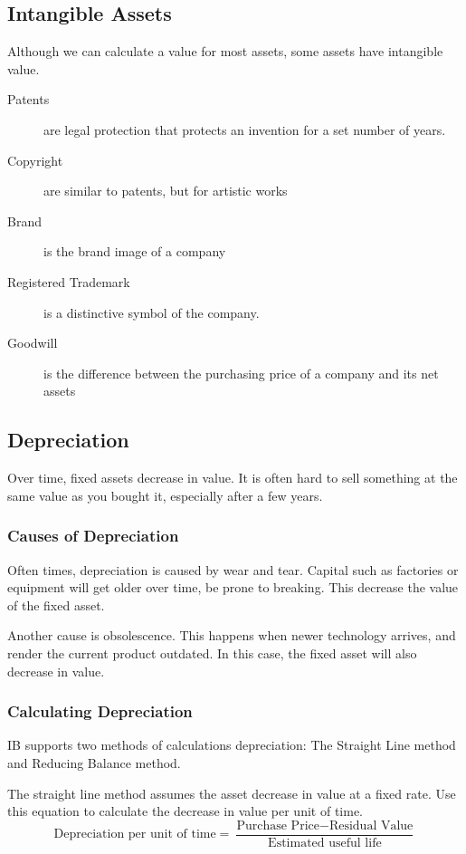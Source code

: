 \documentclass{standalone}
\begin{document}
\subsection{Intangible Assets}
Although we can calculate a value for most assets, some assets have intangible value.
\begin{description}
    \item[Patents] are legal protection that protects an invention for a set number of years.
    \item[Copyright] are similar to patents, but for artistic works
    \item[Brand] is the brand image of a company
    \item[Registered Trademark] is a distinctive symbol of the company.
    \item[Goodwill] is the difference between the purchasing price of a company and its net assets
\end{description}

\subsection{Depreciation}
Over time, fixed assets decrease in value.
It is often hard to sell something at the same value as you bought it, especially after a few years.

\subsubsection{Causes of Depreciation}
Often times, depreciation is caused by wear and tear.
Capital such as factories or equipment will get older over time, be prone to breaking.
This decrease the value of the fixed asset.

Another cause is obsolescence.
This happens when newer technology arrives, and render the current product outdated.
In this case, the fixed asset will also decrease in value.

\subsubsection{Calculating Depreciation}
IB supports two methods of calculations depreciation:
The Straight Line method and Reducing Balance method.

The straight line method assumes the asset decrease in value at a fixed rate.
Use this equation to calculate the decrease in value per unit of time.
\begin{equation}
    \textrm{Depreciation per unit of time} = \frac{\textrm{Purchase Price} - \textrm{Residual Value}}{\textrm{Estimated useful life}}
\end{equation}
\end{document}
